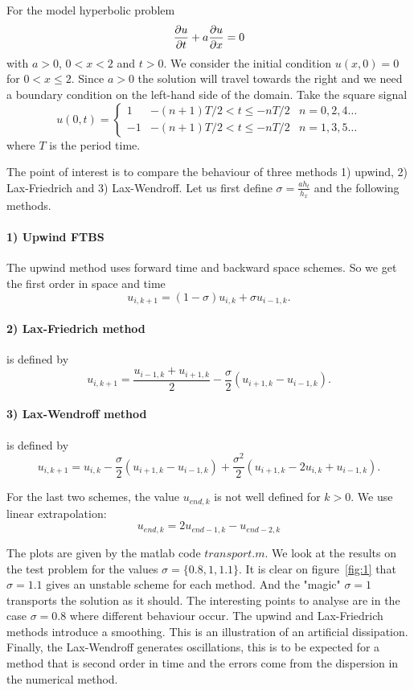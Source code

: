 
For the model hyperbolic problem 
\begin{equation}
\dfrac{\partial u}{\partial t}+a\dfrac{\partial u}{\partial x}=0
\end{equation}
with $a>0$, $0<x<2$ and $t>0$. We consider the initial condition $u(x,0)=0$ for $0<x\leq 2$. Since $a>0$ the solution will travel towards the right and we need a boundary condition on the left-hand side of the domain. Take the square signal 
$$
u(0,t)=\left\{\begin{array}{lcc}
1 & -(n+1)T/2<t\leq -nT/2 & n = 0,2,4\dots\\
-1 & -(n+1)T/2<t\leq -nT/2 & n = 1,3,5\dots
\end{array}\right.
$$
where $T$ is the period time.

The point of interest is to compare the behaviour of three methods 1) upwind, 2) Lax-Friedrich
and 3) Lax-Wendroff. Let us first define $\sigma=\frac{ah_t}{h_x}$ and the following methods.

\paragraph*{1) Upwind FTBS} The upwind method uses forward time and backward space schemes. So we get the first order in space and time 
$$u_{i,k+1}=(1-\sigma)u_{i,k}+\sigma u_{i-1,k}.$$ 


\paragraph*{2) Lax-Friedrich method} is defined by 
$$u_{i,k+1} = \dfrac{u_{i-1,k}+u_{i+1,k}}{2}-\dfrac{\sigma}{2}(u_{i+1,k}-u_{i-1,k}).$$

\paragraph*{3) Lax-Wendroff method} is defined by 
$$u_{i,k+1} = u_{i,k} -\dfrac{\sigma}{2}(u_{i+1,k}-u_{i-1,k}) +\dfrac{\sigma^2}{2}(u_{i+1,k}-2u_{i,k}+u_{i-1,k}).$$

For the last two schemes, the value $u_{end,k}$ is not well defined for $k>0$. We use linear extrapolation: $$u_{end,k} = 2u_{end-1,k}-u_{end-2,k}$$

The plots are given by the matlab code $transport.m$. We look at the results on the test problem for the values $\sigma = \{0.8, 1, 1.1\}$. It is clear on figure~\ref{fig:1} that $\sigma=1.1$ gives an unstable scheme for each method. And the "magic" $\sigma=1$ transports the solution as it should. The interesting points to analyse are in the case $\sigma=0.8$ where different behaviour occur. The upwind and Lax-Friedrich methods introduce a smoothing. This is an illustration of an artificial dissipation. Finally, the Lax-Wendroff generates oscillations, this is to be expected for a method that is second order in time and the errors come from the dispersion in the numerical method.

